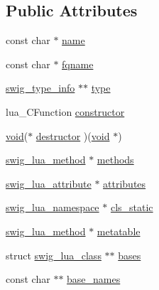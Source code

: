 \subsection*{Public Attributes}
\begin{DoxyCompactItemize}
\item 
const char $\ast$ \mbox{\hyperlink{structswig__lua__class_abefc5d1a37e06e1c9305d3456a59f2d0}{name}}
\item 
const char $\ast$ \mbox{\hyperlink{structswig__lua__class_a3c6469ebd6d312208ff380f8e8eff165}{fqname}}
\item 
\mbox{\hyperlink{structswig__type__info}{swig\+\_\+type\+\_\+info}} $\ast$$\ast$ \mbox{\hyperlink{structswig__lua__class_a139831b0d9b661d6e64c1f902d63142d}{type}}
\item 
lua\+\_\+\+C\+Function \mbox{\hyperlink{structswig__lua__class_aac6eb9dc9a5e0b5f2c9d31a97ce0282e}{constructor}}
\item 
\mbox{\hyperlink{_thread_8h_af1e856da2e658414cb2456cb6f7ebc66}{void}}($\ast$ \mbox{\hyperlink{structswig__lua__class_a19ebe1411a51b4d1ef82432e76353854}{destructor}} )(\mbox{\hyperlink{_thread_8h_af1e856da2e658414cb2456cb6f7ebc66}{void}} $\ast$)
\item 
\mbox{\hyperlink{swig__runtime_8h_a89958881f4c9d723a197b20ac42f6946}{swig\+\_\+lua\+\_\+method}} $\ast$ \mbox{\hyperlink{structswig__lua__class_ae0d9f30a8114623b1185b5907fc60719}{methods}}
\item 
\mbox{\hyperlink{structswig__lua__attribute}{swig\+\_\+lua\+\_\+attribute}} $\ast$ \mbox{\hyperlink{structswig__lua__class_a3061adc91d7cb1a16967927e8d4a7261}{attributes}}
\item 
\mbox{\hyperlink{structswig__lua__namespace}{swig\+\_\+lua\+\_\+namespace}} $\ast$ \mbox{\hyperlink{structswig__lua__class_a41b17587e0b26e2112200adfffb22730}{cls\+\_\+static}}
\item 
\mbox{\hyperlink{swig__runtime_8h_a89958881f4c9d723a197b20ac42f6946}{swig\+\_\+lua\+\_\+method}} $\ast$ \mbox{\hyperlink{structswig__lua__class_a7c56e45895444992b6a42c60ba6a17e5}{metatable}}
\item 
struct \mbox{\hyperlink{structswig__lua__class}{swig\+\_\+lua\+\_\+class}} $\ast$$\ast$ \mbox{\hyperlink{structswig__lua__class_a468e2d019d6cff6bbe8fefc8f572420b}{bases}}
\item 
const char $\ast$$\ast$ \mbox{\hyperlink{structswig__lua__class_a25f24829385c30c59cec92c91fceca23}{base\+\_\+names}}
\end{DoxyCompactItemize}


